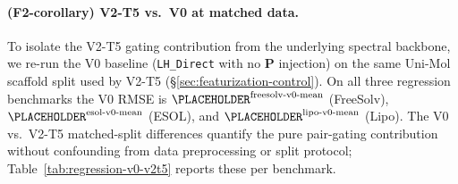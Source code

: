 \paragraph{(F2-corollary) V2-T5 vs.\ V0 at matched data.}
To isolate the V2-T5 gating contribution from the underlying spectral
backbone, we re-run the V0 baseline (\texttt{LH\_Direct} with no
$\mathbf{P}$ injection) on the same Uni-Mol scaffold split used by
V2-T5 (\S\ref{sec:featurization-control}). On all three regression
benchmarks the V0 RMSE is
$\PLACEHOLDER^{\text{freesolv-v0-mean}}$ (FreeSolv),
$\PLACEHOLDER^{\text{esol-v0-mean}}$ (ESOL), and
$\PLACEHOLDER^{\text{lipo-v0-mean}}$ (Lipo). The V0 vs.\ V2-T5
matched-split differences quantify the pure pair-gating contribution
without confounding from data preprocessing or split protocol;
Table~\ref{tab:regression-v0-v2t5} reports these per benchmark.

%

